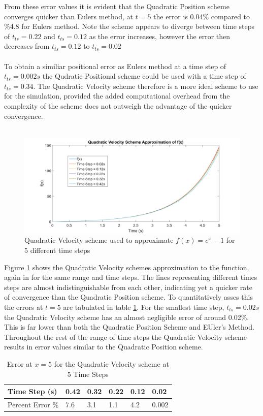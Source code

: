 From these error values it is evident that the Quadratic Position scheme converges quicker than Eulers method, at $t=5$ the error is 0.04\% compared to \%4.8 for Eulers method. Note the scheme appears to diverge between time steps of $t_{ts}=0.22$ and $t_{ts}=0.12$ as the error increases, however the error then decreases from $t_{ts}=0.12$ to $t_{ts}=0.02$
\\\\
To obtain a similiar positional error as Eulers method at a time step of $t_{ts}=0.002s$ the Qudratic Positional scheme could be used with a time step of $t_{ts}=0.34$. The Quadratic Velocity scheme therefore is a more ideal scheme to use for the simulation, provided the added computational overhead from the complexity of the scheme does not outweigh the advantage of the quicker convergence.
\\\\
\begin{figure}[H]
\centering
\includegraphics[width=1.0\textwidth]{Figures/QuadraticvelocityScheme.png}
\caption{\label{fig:QV1} Quadratic Velocity scheme used to approximate $f(x)=e^x-1$ for 5 different time steps}
\end{figure} 
Figure \ref{fig:QV1} shows the Quadratic Velocity schemes approximation to the function, again in for the same range and time steps. The lines representing different times steps are almost indistinguishable from each other, indicating yet a quicker rate of convergence than the Quadratic Position scheme. To quantitatively asses this the errors at $t=5$ are tabulated in table \ref{tab:QVerror}. For the smallest time step, $t_{ts}=0.02s$ the Quadratic Velocity scheme has an almost negligible error of around 0.02\%. This is far lower than both the Quadratic Position Scheme and EUler's Method. Throughout the rest of the range of time steps the Quadratic Velocity scheme results in error values similar to the Quadratic Position scheme.

\begin{table}[H]
\centering
\begin{tabular}{llllll}
\multicolumn{1}{l|}{Time Step (s)}    & 0.42 & 0.32 & 0.22 & 0.12 & 0.02  \\ \hline
\multicolumn{1}{l|}{Percent Error \%} & 7.6  & 3.1  & 1.1  & 4.2  & 0.002    
\end{tabular}
\caption{Error at $x=5$ for the Quadratic Velocity scheme at 5 Time Steps}
\label{tab:QVerror}
\end{table}

